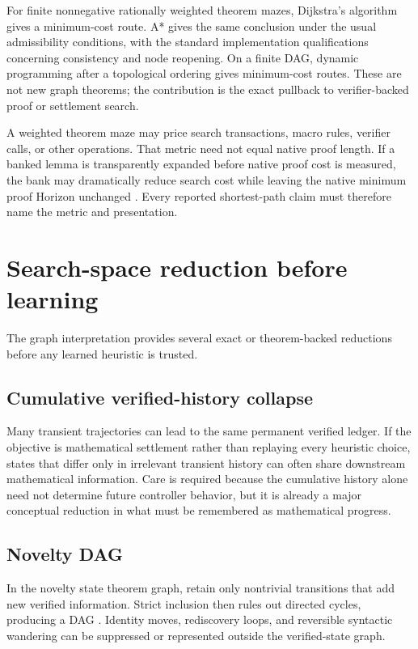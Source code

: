\begin{remark}[Examples]
For finite nonnegative rationally weighted theorem mazes, Dijkstra's algorithm gives a minimum-cost route. A* gives the same conclusion under the usual admissibility conditions, with the standard implementation qualifications concerning consistency and node reopening. On a finite DAG, dynamic programming after a topological ordering gives minimum-cost routes. These are not new graph theorems; the contribution is the exact pullback to verifier-backed proof or settlement search.
\end{remark}

\begin{caution}
A weighted theorem maze may price search transactions, macro rules, verifier calls, or other operations. That metric need not equal native proof length. If a banked lemma is transparently expanded before native proof cost is measured, the bank may dramatically reduce search cost while leaving the native minimum proof Horizon unchanged \cite{data3}. Every reported shortest-path claim must therefore name the metric and presentation.
\end{caution}

\section{Search-space reduction before learning}
The graph interpretation provides several exact or theorem-backed reductions before any learned heuristic is trusted.

\subsection{Cumulative verified-history collapse}
Many transient trajectories can lead to the same permanent verified ledger. If the objective is mathematical settlement rather than replaying every heuristic choice, states that differ only in irrelevant transient history can often share downstream mathematical information. Care is required because the cumulative history alone need not determine future controller behavior, but it is already a major conceptual reduction in what must be remembered as mathematical progress.

\subsection{Novelty DAG}
In the novelty state theorem graph, retain only nontrivial transitions that add new verified information. Strict inclusion then rules out directed cycles, producing a DAG \cite{depths}. Identity moves, rediscovery loops, and reversible syntactic wandering can be suppressed or represented outside the verified-state graph.


